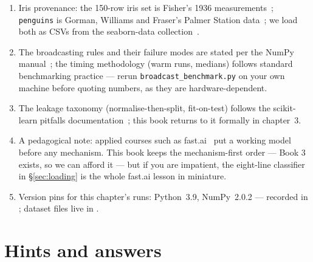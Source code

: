 \begin{enumerate}
\item Iris provenance: the 150-row iris set is Fisher's 1936
  measurements~\cite{fisher1936}; \texttt{penguins} is Gorman, Williams and
  Fraser's Palmer Station data~\cite{gorman2014}; we load both as CSVs from
  the seaborn-data collection~\cite{seaborn-data}.
\item The broadcasting rules and their failure modes are stated per the NumPy
  manual~\cite{npbroadcast}; the timing methodology (warm runs, medians)
  follows standard benchmarking practice --- rerun
  \texttt{broadcast\_benchmark.py} on your own machine before quoting numbers,
  as they are hardware-dependent.
\item The leakage taxonomy (normalise-then-split, fit-on-test) follows the
  scikit-learn pitfalls documentation~\cite{sklearnpitfalls}; this book
  returns to it formally in chapter~3.
\item A pedagogical note: applied courses such as fast.ai~\cite{fastai2022}
  put a working model before any mechanism. This book keeps the
  mechanism-first order --- Book 3 exists, so we can afford it --- but if you
  are impatient, the eight-line classifier in \S\ref{sec:loading} is the whole
  fast.ai lesson in miniature.
\item Version pins for this chapter's runs: Python~3.9, NumPy~2.0.2 ---
  recorded in ; dataset files live in .
\end{enumerate}

\section*{Hints and answers}

